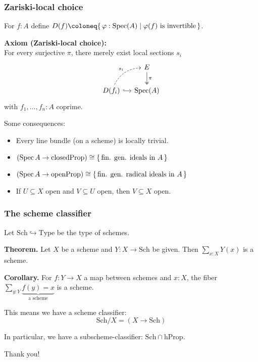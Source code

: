 \documentclass{beamer}
\begin{document}
\begin{frame}
  \frametitle{Zariski-local choice}

  For $f : A$ define $D(f) \coloneq \{\,\varphi : \Spec(A) \mid \text{$\varphi(f)$ is invertible}\,\}$.

  \vspace{2.5mm}
  \textbf{Axiom (Zariski-local choice):}\\
  For every surjective $\pi$, there merely exist local sections $s_i$
  \[ \begin{tikzcd}[ampersand replacement=\&, column sep=small]
    \& E \ar[d, two heads, "\pi"] \\
    D(f_i) \ar[r, hook] \ar[ur, bend left, dashed, "s_i"] \& \Spec(A)
  \end{tikzcd} \]
  with $f_1, \dots, f_n : A$ coprime.

  \pause
  \vspace{5mm}
  Some consequences:
  \begin{itemize}
    \item
      Every line bundle (on a scheme) is locally trivial.
    \item
      $(\operatorname{Spec} A \to \mathrm{closedProp}) \cong \{\,\text{fin. gen. ideals in $A$}\,\}$
    \item
      $(\operatorname{Spec} A \to \mathrm{openProp}) \cong \{\,\text{fin. gen. radical ideals in $A$}\,\}$
    \item
      If $U \subseteq X$ open and $V \subseteq U$ open,
      then $V \subseteq X$ open.
  \end{itemize}
\end{frame}

\begin{frame}
  \frametitle{The scheme classifier}

  Let $\mathrm{Sch} \hookrightarrow \mathrm{Type}$
  be the type of schemes.

  \vspace{5mm}
  \textbf{Theorem.}
  Let $X$ be a scheme and $Y : X \to \mathrm{Sch}$ be given.
  Then $\sum_{x : X} Y(x)$ is a scheme.

  \vspace{2.5mm}
  \textbf{Corollary.}
  For $f : Y \to X$ a map between schemes
  and $x : X$,
  the fiber $\sum_{y : Y} \underbrace{f(y) = x}_{\text{a scheme}}$
  is a scheme.

  \pause
  \vspace{5mm}
  This means we have a scheme classifier:
  \[ \mathrm{Sch}/X = (X \to \mathrm{Sch}) \]

  \vspace{2.5mm}
  In particular, we have a subscheme-classifier:
  $\mathrm{Sch} \cap \mathrm{hProp}$.
\end{frame}

\begin{frame}
  \centering
  Thank you!
\end{frame}
\end{document}
